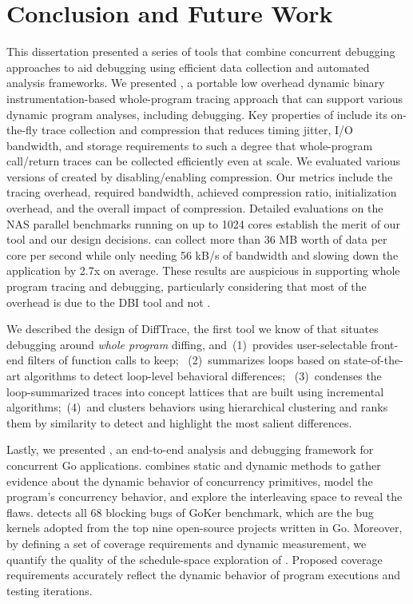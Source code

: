 
\chapter{Conclusion and Future Work}
\label{sec:ch5}
This dissertation presented a series of tools that combine concurrent debugging approaches to aid debugging using efficient data collection and automated analysis frameworks.
%
We presented \parlot, a portable low overhead dynamic binary instrumentation-based whole-program tracing approach that can support various dynamic program analyses, including debugging.
%
Key properties of \parlot include its on-the-fly trace collection and compression that reduces timing jitter, I/O bandwidth, and storage requirements to such a degree that whole-program call/return traces can be collected efficiently even at scale.
%
We evaluated various versions of \parlot created by disabling/enabling compression.
%
Our metrics include the tracing overhead, required bandwidth, achieved compression ratio, initialization overhead, and the overall impact of compression.
%
Detailed evaluations on the NAS parallel benchmarks running on up to 1024 cores establish the merit of our tool and our design decisions. \parlot can collect more than 36 MB worth of data per core per second while only needing 56 kB/s of bandwidth and slowing down the application by 2.7x on average.
%
These results are auspicious in supporting whole program tracing and debugging, particularly considering that most of the overhead is due to the DBI tool and not \parlot.
%


We described the design of DiffTrace, the first tool we know of that situates debugging around {\em whole program} diffing, and~(1)~provides user-selectable front-end filters of function calls to keep;
~(2)~summarizes loops based on state-of-the-art algorithms to detect loop-level behavioral differences;
~(3)~condenses the loop-summarized traces into concept lattices that are built using incremental algorithms;~(4)~and clusters behaviors using hierarchical clustering and ranks them by similarity to detect and highlight the most salient differences.

Lastly, we presented \goat, an end-to-end analysis and debugging framework for concurrent Go applications.
%
\goat combines static and dynamic methods to gather evidence about the dynamic behavior of concurrency primitives, model the program's concurrency behavior, and explore the interleaving space to reveal the flaws.
%
\goat detects all 68 blocking bugs of GoKer benchmark, which are the bug kernels adopted from the top nine open-source projects written in Go.
%
Moreover, by defining a set of coverage requirements and dynamic measurement, we quantify the quality of the schedule-space exploration of \goat.
%
Proposed coverage requirements accurately reflect the dynamic behavior of program executions and testing iterations.
%

